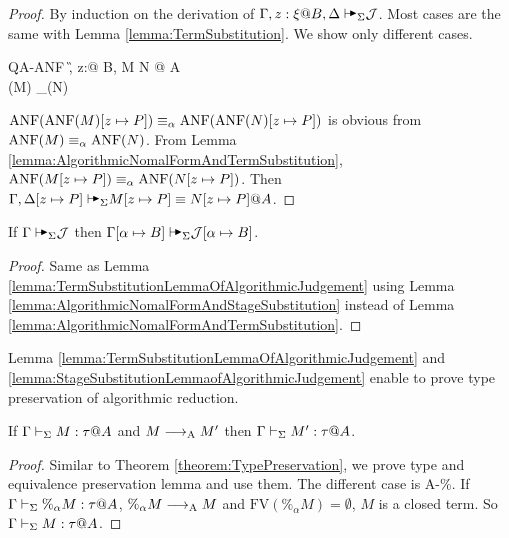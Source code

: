 \begin{proof}
    By induction on the derivation of \( \G, z:\xi@B, \D \AVS \mathcal{J}
    \). Most cases are the same with Lemma \ref{lemma:TermSubstitution}. We show
    only different cases.

    \begin{rneqncase}{\textsc{QA-ANF}}{
            \G, z:\xi @ B, \D \AVS M \E N @ A \\
            \ANF(M) \E_\alpha \ANF(N)
        }
    \end{rneqncase}
    \( \text{ANF}(\text{ANF}(M)[z \mapsto P]) \equiv_\alpha \text{ANF}(\text{ANF}(N)[z \mapsto P]) \) is obvious from \( \text{ANF}(M) \equiv_\alpha \text{ANF}(N) \).
    From Lemma \ref{lemma:AlgorithmicNomalFormAndTermSubstitution}, \( \text{ANF}(M[z \mapsto P]) \equiv_\alpha \text{ANF}(N[z \mapsto P]) \).
    Then \( \G, \D[z \mapsto P] \AVS M[z \mapsto P] \E N[z \mapsto P] @ A \).
\end{proof}

\begin{lemma}
    \label{lemma:StageSubstitutionLemmaofAlgorithmicJudgement}
    If $\G \AVS \mathcal{J}$ then $\G[\alpha \mapsto B] \AVS \mathcal{J}[\alpha \mapsto B]$.
\end{lemma}

\begin{proof}
    Same as Lemma \ref{lemma:TermSubstitutionLemmaOfAlgorithmicJudgement} using
    Lemma \ref{lemma:AlgorithmicNomalFormAndStageSubstitution} instead of Lemma
    \ref{lemma:AlgorithmicNomalFormAndTermSubstitution}.
\end{proof}

Lemma \ref{lemma:TermSubstitutionLemmaOfAlgorithmicJudgement} and
\ref{lemma:StageSubstitutionLemmaofAlgorithmicJudgement} enable to prove type
preservation of algorithmic reduction.

\begin{lemma}
    \label{lemma:TypePreservationofAlgorithmicReduction}
    If \( \Gamma \vdash_\Sigma M:\tau @A \) and \( M \longrightarrow_{\text{A}} M' \) then \( \Gamma \vdash_\Sigma M' : \tau @ A \).
\end{lemma}

\begin{proof}
    Similar to Theorem \ref{theorem:TypePreservation}, we prove type and
    equivalence preservation lemma and use them. The different case is
    \textsc{A-\%}.  If \( \Gamma \vdash_\Sigma \%_\alpha M : \tau @ A \), \( \%_\alpha M \longrightarrow_{\text{A}} M
    \) and \( \text{FV}(\%_\alpha M) = \emptyset \), \( M \) is a closed term.
    So \( \Gamma \vdash_\Sigma M : \tau @ A \).
\end{proof}

